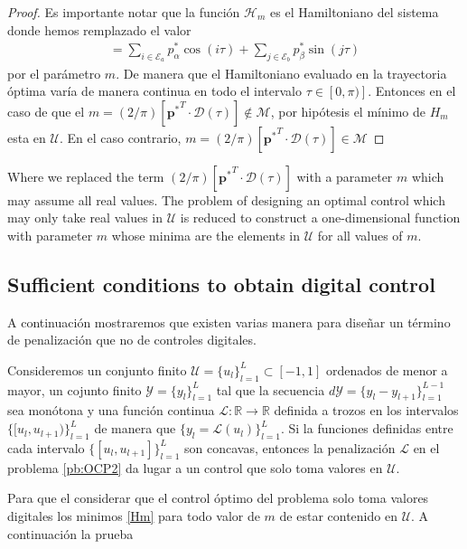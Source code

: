 \begin{proof}
Es importante notar que la función $\mathcal{H}_m$ es el Hamiltoniano del sistema donde hemos remplazado el valor 
\begin{gather}
	[{\bm{p}^*}^T \cdot \bm{\mathcal{D}}(\tau)] = \sum_{i \in \mathcal{E}_a} p^*_\alpha \cos(i\tau) + \sum_{j \in \mathcal{E}_b} p^*_\beta \sin(j\tau) 
\end{gather}
por el parámetro $m$. De manera que el Hamiltoniano evaluado en la trayectoria óptima varía de manera continua en todo el intervalo $\tau \in [0,\pi)]$. Entonces en el caso de que el $m = (2/\pi)[{\bm{p}^*}^T \cdot \bm{\mathcal{D}}(\tau)] \notin \mathcal{M}$, por hipótesis el mínimo de $H_m$ esta en $\mathcal{U}$. En el caso contrario, $m = (2/\pi)[{\bm{p}^*}^T \cdot \bm{\mathcal{D}}(\tau)] \in \mathcal{M}$  

\end{proof}
Where we replaced the term $(2/\pi)[{\bm{p}^*}^T \cdot \bm{\mathcal{D}}(\tau)]$ with a parameter $m$ which may assume all real values. The problem of designing an optimal control which may only take real values in $\mathcal{U}$ is reduced to construct a one-dimensional function with parameter $m$ whose minima are the elements in $\mathcal{U}$ for all values of $m$.

\subsection{Sufficient conditions to obtain digital control}

A continuación mostraremos que existen varias manera para diseñar un término de penalización que no de controles digitales.
\newline
\begin{theorem}
    Consideremos un conjunto finito $\mathcal{U}=\{u_l\}_{l=1}^L \subset [-1,1] $ ordenados de menor a mayor, un cojunto finito $\mathcal{Y} = \{y_l\}_{l=1}^L$ tal que la  secuencia $d\mathcal{Y} = \{y_l - y_{l+1}\}_{l=1}^{L-1}$ sea monótona y una función continua $\mathcal{L}:\mathbb{R} \rightarrow \mathbb{R}$ definida a trozos en los intervalos $\{ [u_l,u_{l+1})\}_{l=1}^L$ de manera que $\{y_l = \mathcal{L}(u_l)\}_{l=1}^L$. Si la funciones definidas entre cada intervalo $\{[u_l,u_{l+1}]\}_{l=1}^L$ son concavas, entonces la penalización $\mathcal{L}$ en el problema \ref{pb:OCP2} da lugar a un control que solo toma valores en $\mathcal{U}$.
\end{theorem}
Para que el considerar que el control óptimo del problema solo toma valores digitales los minimos  \ref{Hm} para todo valor de $m$ de estar contenido en $\mathcal{U}$. A continuación la prueba
\newline

